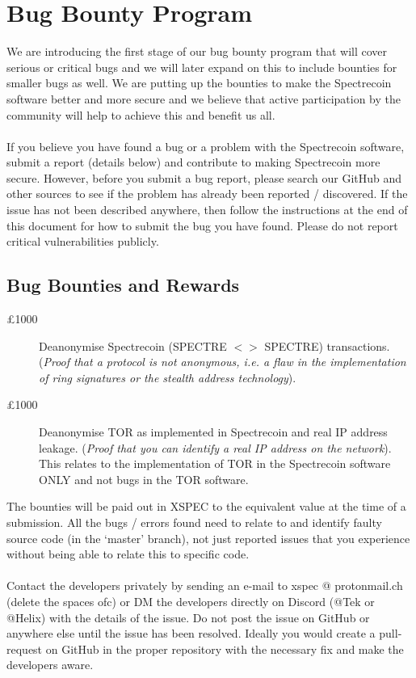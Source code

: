 \section{Bug Bounty Program}
We are introducing the first stage of our bug bounty program that will cover
serious or critical bugs and we will later expand on this to include bounties
for smaller bugs as well. We are putting up the bounties to make the
Spectrecoin software better and more secure and we believe that active
participation by the community will help to achieve this and benefit us all.
\\
\\
\noindent
If you believe you have found a bug or a problem with the Spectrecoin
software, submit a report (details below) and contribute to making
Spectrecoin more secure. However, before you submit a bug report, please
search our GitHub and other sources to see if the problem has already
been reported / discovered. If the issue has not been described anywhere,
then follow the instructions at the end of this document for how to submit
the bug you have found. Please do not report critical vulnerabilities
publicly.



\subsection{Bug Bounties and Rewards}
\begin{description}
	\item[£1000] Deanonymise Spectrecoin (SPECTRE $<>$ SPECTRE)
	transactions. (\textit{Proof that a protocol is not anonymous,
	i.e. a flaw in the implementation of ring signatures or the stealth
	address technology}).
	\item[£1000] Deanonymise TOR as implemented in Spectrecoin and real
	IP address leakage. (\textit{Proof that you can identify a real IP
	address on the network}). This relates to the implementation of TOR
	in the Spectrecoin software ONLY and not bugs in the TOR software.
\end{description}


\noindent
The bounties will be paid out in XSPEC to the equivalent value at the time
of a submission. All the bugs / errors found need to relate to and identify
faulty source code (in the ‘master’ branch), not just reported issues that
you experience without being able to relate this to specific code.
\\
\\
\noindent
Contact the developers privately by sending an e-mail to xspec @ protonmail.ch
(delete the spaces ofc) or DM the developers directly on Discord (@Tek or
@Helix) with the details of the issue. Do not post the issue on GitHub or
anywhere else until the issue has been resolved. Ideally you would create
a pull-request on GitHub in the proper repository with the necessary fix
and make the developers aware.

